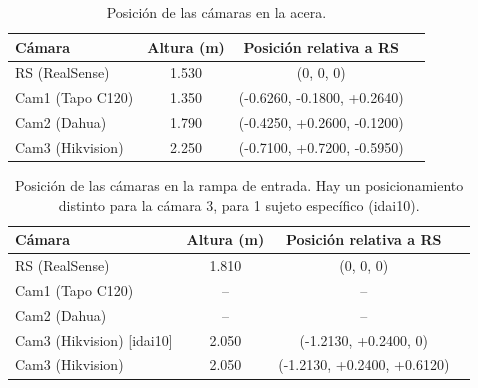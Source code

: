 \begin{table}[!ht]
\centering
\scriptsize
\begin{tabular}{|l|c|c|c|}
\hline
\rowcolor[HTML]{FFCB2F}
\textbf{Cámara} & \textbf{Altura (m)} & \textbf{Posición relativa a RS} \\
\hline
RS (RealSense) & 1.530 & (0, 0, 0) \\
\hline
Cam1 (Tapo C120) & 1.350 & (-0.6260, -0.1800, +0.2640) \\
\hline
Cam2 (Dahua) & 1.790 & (-0.4250, +0.2600, -0.1200) \\
\hline
Cam3 (Hikvision) & 2.250 & (-0.7100, +0.7200, -0.5950) \\
\hline
\end{tabular}
\caption{Posición de las cámaras en la acera.}\label{tab:Sidewalk}
\end{table}

\begin{table}[H]
\centering
\scriptsize
\begin{tabular}{|l|c|c|c|}
\hline
\rowcolor[HTML]{FFCB2F}
\textbf{Cámara} & \textbf{Altura (m)} & \textbf{Posición relativa a RS} \\
\hline
RS (RealSense) & 1.810 & (0, 0, 0) \\
\hline
Cam1 (Tapo C120) & -- & -- \\
\hline
Cam2 (Dahua) & -- & -- \\
\hline
Cam3 (Hikvision) [idai10] & 2.050 & (-1.2130, +0.2400, 0) \\
\hline
Cam3 (Hikvision) & 2.050 & (-1.2130, +0.2400, +0.6120) \\
\hline
\end{tabular}
\caption[Posición de las cámaras en la rampa de entrada.]{Posición de las cámaras en la rampa de entrada. Hay un posicionamiento distinto para la cámara 3, para 1 sujeto específico (idai10).}\label{tab:EntranceRamp}
\end{table}

